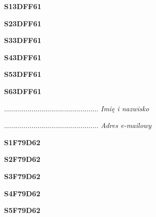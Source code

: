 \begin{turn}{90}\huge \textbf{S13DFF61}\end{turn}

\begin{turn}{90}\huge \textbf{S23DFF61}\end{turn}

\begin{turn}{90}\huge \textbf{S33DFF61}\end{turn}

\begin{turn}{90}\huge \textbf{S43DFF61}\end{turn}

\begin{turn}{90}\huge \textbf{S53DFF61}\end{turn}

\begin{turn}{90}\huge \textbf{S63DFF61}\end{turn}

\begin{turn}{90}\begin{minipage}{\linewidth} \vspace{20mm} ................................................  \textit{Imię i nazwisko}\end{minipage}\end{turn}

\begin{turn}{90}\begin{minipage}{\linewidth} \vspace{20mm} ................................................  \textit{Adres e-mailowy}\end{minipage}\end{turn}

\begin{turn}{90}\huge \textbf{S1F79D62}\end{turn}

\begin{turn}{90}\huge \textbf{S2F79D62}\end{turn}

\begin{turn}{90}\huge \textbf{S3F79D62}\end{turn}

\begin{turn}{90}\huge \textbf{S4F79D62}\end{turn}

\begin{turn}{90}\huge \textbf{S5F79D62}\end{turn}

